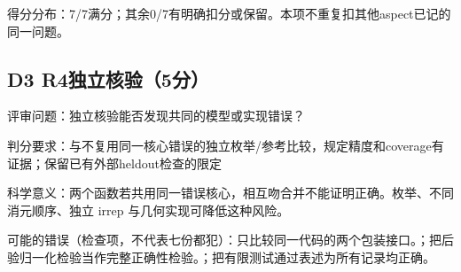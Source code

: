 \documentclass[11pt,a4paper]{article}
\begin{document}
得分分布：7/7满分；其余0/7有明确扣分或保留。本项不重复扣其他aspect已记的同一问题。

\clearpage
\subsection{D3 R4独立核验（5分）}
\label{aspect:D3}
评审问题：独立核验能否发现共同的模型或实现错误？

判分要求：与不复用同一核心错误的独立枚举/参考比较，规定精度和coverage有证据；保留已有外部heldout检查的限定

科学意义：两个函数若共用同一错误核心，相互吻合并不能证明正确。枚举、不同消元顺序、独立 irrep 与几何实现可降低这种风险。

可能的错误（检查项，不代表七份都犯）：只比较同一代码的两个包装接口。；把后验归一化检验当作完整正确性检验。；把有限测试通过表述为所有记录均正确。
\end{document}
